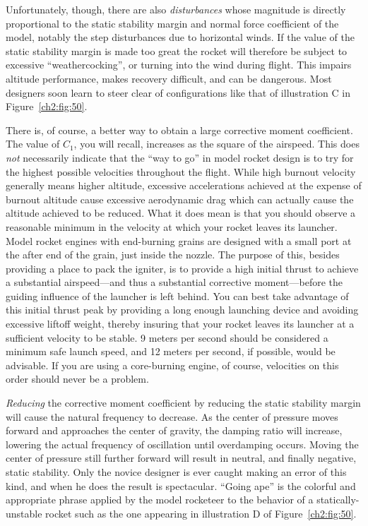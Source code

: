 Unfortunately, though, there are also \emph{disturbances} whose magnitude is
directly proportional to the static stability margin and normal force
coefficient of the model, notably the step disturbances due to horizontal
winds. If the value of the static stability margin is made too great the
rocket will therefore be subject to excessive ``weathercocking'', or turning
into the wind during flight. This impairs altitude performance, makes
recovery difficult, and can be dangerous. Most designers soon learn to steer
clear of configurations like that of illustration C in
Figure~\ref{ch2:fig:50}.

There is, of course, a better way to obtain a large corrective moment
coefficient. The value of $C_1$, you will recall, increases as the square of
the airspeed. This does \emph{not} necessarily indicate that the ``way to
go'' in model rocket design is to try for the highest possible velocities
throughout the flight. While high burnout velocity generally means higher
altitude, excessive accelerations achieved at the expense of burnout altitude
cause excessive aerodynamic drag which can actually cause the altitude
achieved to be reduced. What it does mean is that you should observe a
reasonable minimum in the velocity at which your rocket leaves its launcher.
Model rocket engines with end-burning grains are designed with a small port
at the after end of the grain, just inside the nozzle. The purpose of this,
besides providing a place to pack the igniter, is to provide a high initial
thrust to achieve a substantial airspeed---and thus a substantial corrective
moment---before the guiding influence of the launcher is left behind. You can
best take advantage of this initial thrust peak by providing a long enough
launching device and avoiding excessive liftoff weight, thereby insuring that
your rocket leaves its launcher at a sufficient velocity to be stable. 9
meters per second should be considered a minimum safe launch speed, and 12
meters per second, if possible, would be advisable. If you are using a
core-burning engine, of course, velocities on this order should never be a
problem.

\emph{Reducing} the corrective moment coefficient by reducing the static
stability margin will cause the natural frequency to decrease. As the center
of pressure moves forward and approaches the center of gravity, the damping
ratio will increase, lowering the actual frequency of oscillation until
overdamping occurs. Moving the center of pressure still further forward will
result in neutral, and finally negative, static stability. Only the novice
designer is ever caught making an error of this kind, and when he does the
result is spectacular. ``Going ape'' is the colorful and appropriate phrase
applied by the model rocketeer to the behavior of a statically-unstable
rocket such as the one appearing in illustration D of
Figure~\ref{ch2:fig:50}.


